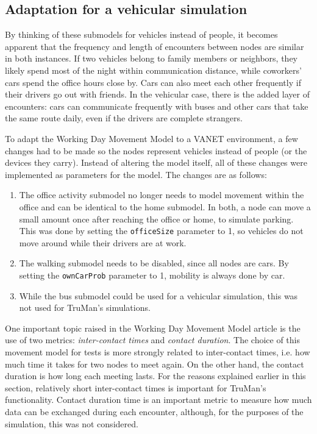 \subsection{Adaptation for a vehicular simulation}
By thinking of these submodels for vehicles instead of people, it becomes apparent that the frequency and length of encounters between nodes are similar in both instances.
If two vehicles belong to family members or neighbors, they likely spend most of the night within communication distance, while coworkers' cars spend the office hours close by.
Cars can also meet each other frequently if their drivers go out with friends.
In the vehicular case, there is the added layer of encounters: cars can communicate frequently with buses and other cars that take the same route daily, even if the drivers are complete strangers.

To adapt the Working Day Movement Model to a VANET environment, a few changes had to be made so the nodes represent vehicles instead of people (or the devices they carry). 
Instead of altering the model itself, all of these changes were implemented as parameters for the model.
The changes are as follows:
\begin{enumerate}
\item
The office activity submodel no longer needs to model movement within the office and can be identical to the home submodel.
In both, a node can move a small amount once after reaching the office or home, to simulate parking.
This was done by setting the \texttt{officeSize} parameter to 1, so vehicles do not move around while their drivers are at work.
\item
The walking submodel needs to be disabled, since all nodes are cars.
By setting the \texttt{ownCarProb} parameter to 1, mobility is always done by car.
\item
While the bus submodel could be used for a vehicular simulation, this was not used for TruMan's simulations.
\end{enumerate}

One important topic raised in the Working Day Movement Model article is the use of two metrics: \textit{inter-contact times} and \textit{contact duration}.
The choice of this movement model for tests is more strongly related to inter-contact times, i.e. how much time it takes for two nodes to meet again.
On the other hand, the contact duration is how long each meeting lasts.
For the reasons explained earlier in this section, relatively short inter-contact times is important for TruMan's functionality.
Contact duration time is an important metric to measure how much data can be exchanged during each encounter, although, for the purposes of the simulation, this was not considered.

